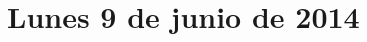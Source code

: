 \documentclass[12pt,spanish]{article}
\begin{document}
  \thispagestyle{empty}
  \pagestyle{empty}
  \section*{Lunes 9 de junio de 2014}

  \begin{certamen}[start=0]
    \item
      
      \newpage
     \item
       
       \newpage
     \item
       
       \newpage
  \end{certamen}
\end{document}
